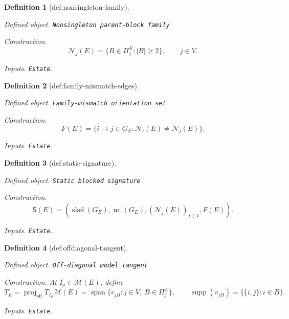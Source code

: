\documentclass{article}
\newtheorem{definition}{Definition}
\begin{document}
\begin{definition}[def:nonsingleton-family]\label{def:nonsingleton-family}
\par\smallskip\noindent\emph{Defined object.} \texttt{Nonsingleton parent-\allowbreak{}block family}
\par\smallskip\noindent\emph{Construction.} \[\mathcal N_j(E)=\{B\in\Pi^E_j:|B|\geq2\},\qquad j\in V.\]
\par\smallskip\noindent\emph{Inputs.} \texttt{Estate}.
\end{definition}

\begin{definition}[def:family-mismatch-edges]\label{def:family-mismatch-edges}
\par\smallskip\noindent\emph{Defined object.} \texttt{Family-\allowbreak{}mismatch orientation set}
\par\smallskip\noindent\emph{Construction.} \[F(E)=\{i\to j\in G_E:\mathcal N_i(E)\neq\mathcal N_j(E)\}.\]
\par\smallskip\noindent\emph{Inputs.} \texttt{Estate}.
\end{definition}

\begin{definition}[def:static-signature]\label{def:static-signature}
\par\smallskip\noindent\emph{Defined object.} \texttt{Static blocked signature}
\par\smallskip\noindent\emph{Construction.} \[\mathsf S(E)=\left(\operatorname{skel}(G_E),\operatorname{uc}(G_E),(\mathcal N_j(E))_{j\in V},F(E)\right).\]
\par\smallskip\noindent\emph{Inputs.} \texttt{Estate}.
\end{definition}

\begin{definition}[def:offdiagonal-tangent]\label{def:offdiagonal-tangent}
\par\smallskip\noindent\emph{Defined object.} \texttt{Off-\allowbreak{}diagonal model tangent}
\par\smallskip\noindent\emph{Construction.} At \(I_p\in\mathcal M(E)\), define \[T_E^{\circ}=\operatorname{proj}_{\mathrm{off}}T_{I_p}\mathcal M(E)=\operatorname{span}\{v_{jB}:j\in V,\ B\in\Pi^E_j\},\qquad \operatorname{supp}(v_{jB})=\{\{i,j\}:i\in B\}.\]
\par\smallskip\noindent\emph{Inputs.} \texttt{Estate}.
\end{definition}
\end{document}

